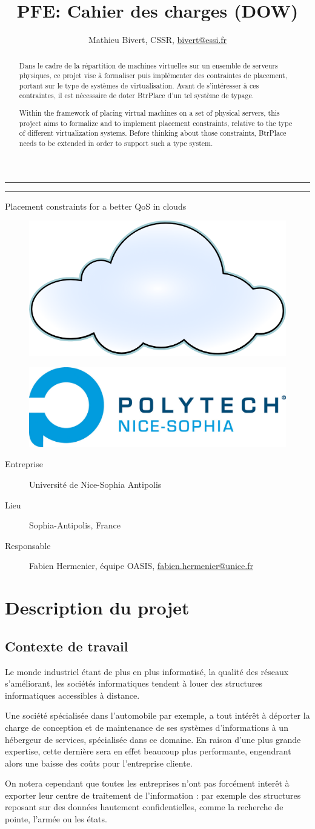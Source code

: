 \documentclass[a4paper]{article}
\author{Mathieu Bivert, CSSR, \href{mailto:bivert@essi.fr}{bivert@essi.fr}}
\title{PFE: Cahier des charges (DOW)}
\makeatletter
\def\maketitle{%
  \null
  \thispagestyle{empty}%
  \vskip 1cm
  \begin{flushright}
        \normalfont\Large\@author
  \end{flushright}
  \vfil
  \hrule height 2pt
  \par
  \begin{center}
        \huge \strut \@title \par
  \end{center}
  \hrule height 2pt
  \par
  \vfil
  \vfil
  \null
\begin{center}
\Huge{Placement constraints for a better QoS in clouds}
\end{center}
\begin{figure}[!ht]
	\centering
	\includegraphics[scale=.45]{imgs/cloud.png}
\end{figure}
\vfil
\begin{figure}[!ht]
	\centering
	\includegraphics[scale=.5]{imgs/polytech.png}
\end{figure}
\vfil
\begin{description}
	\item[Entreprise] Université de Nice-Sophia Antipolis
	\item[Lieu] Sophia-Antipolis, France
	\item[Responsable] Fabien Hermenier, équipe OASIS,
		\href{mailto:fabien.hermenier@unice.fr}{fabien.hermenier@unice.fr}
\end{description}
\cleardoublepage
}
\makeatother
\begin{document}
\maketitle

\begin{abstract}
Dans le cadre de la répartition de machines virtuelles sur un ensemble de
serveurs physiques, ce projet vise à formaliser puis implémenter des
contraintes de placement, portant sur le type de systèmes de virtualisation.
Avant de s'intéresser à ces contraintes, il est nécessaire de doter BtrPlace
d'un tel système de typage.
\end{abstract}

\begin{abstract}
Within the framework of placing virtual machines on a set of physical servers,
this project aims to formalize and to implement placement constraints,
relative to the type of different virtualization systems. Before thinking
about those constraints, BtrPlace needs to be extended in order to support such
a type system.
\end{abstract}

\tableofcontents
\newpage
\section{Description du projet}
\subsection{Contexte de travail}
Le monde industriel étant de plus en plus informatisé, la qualité des
réseaux s'améliorant, les sociétés informatiques tendent à  louer des
structures informatiques accessibles à distance.

Une société spécialisée dans l'automobile par exemple, a tout intérêt
à déporter la charge de conception et de maintenance de ses systèmes
d'informations à un hébergeur de services, spécialisée dans ce domaine.
En raison d'une plus grande expertise, cette dernière sera en effet beaucoup
plus performante, engendrant alors une baisse des coûts pour l'entreprise
cliente.

On notera cependant que toutes les entreprises n'ont pas forcément
interêt à exporter leur centre de traitement de l'information : par
exemple des structures reposant sur des données hautement confidentielles,
comme la recherche de pointe, l'armée ou les états.
\end{document}
